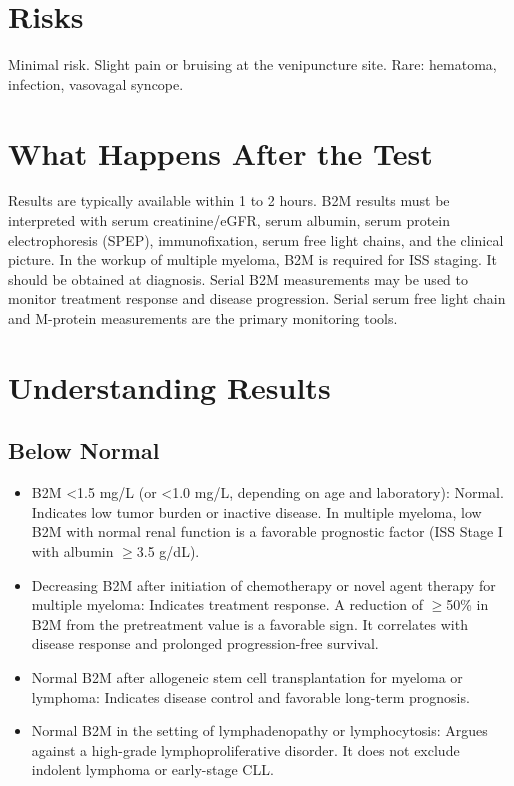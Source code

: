 \section*{Risks}
Minimal risk. Slight pain or bruising at the venipuncture site. Rare: hematoma, infection, vasovagal syncope.

\section*{What Happens After the Test}
Results are typically available within 1 to 2 hours. B2M results must be interpreted with serum creatinine/eGFR, serum albumin, serum protein electrophoresis (SPEP), immunofixation, serum free light chains, and the clinical picture. In the workup of multiple myeloma, B2M is required for ISS staging. It should be obtained at diagnosis. Serial B2M measurements may be used to monitor treatment response and disease progression. Serial serum free light chain and M-protein measurements are the primary monitoring tools.

\section*{Understanding Results}

\subsection*{Below Normal}
\begin{itemize}
  \item B2M <1.5 mg/L (or <1.0 mg/L, depending on age and laboratory): Normal. Indicates low tumor burden or inactive disease. In multiple myeloma, low B2M with normal renal function is a favorable prognostic factor (ISS Stage I with albumin $\geq$3.5 g/dL).
  \item Decreasing B2M after initiation of chemotherapy or novel agent therapy for multiple myeloma: Indicates treatment response. A reduction of $\geq$50\% in B2M from the pretreatment value is a favorable sign. It correlates with disease response and prolonged progression-free survival.
  \item Normal B2M after allogeneic stem cell transplantation for myeloma or lymphoma: Indicates disease control and favorable long-term prognosis.
  \item Normal B2M in the setting of lymphadenopathy or lymphocytosis: Argues against a high-grade lymphoproliferative disorder. It does not exclude indolent lymphoma or early-stage CLL.
\end{itemize}

